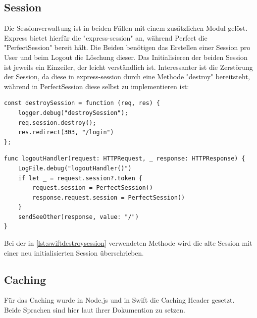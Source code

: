 \subsection{Session}
Die Sessionverwaltung ist in beiden Fällen mit einem zusätzlichen Modul gelöst. Express bietet hierfür die "express-session" an, während Perfect die "PerfectSession" bereit hält. Die Beiden benötigen das Erstellen einer Session pro User und beim Logout die Löschung dieser. Das Initialisieren der beiden Session ist jeweils ein Einzeiler, der leicht verständlich ist. Interessanter ist die Zerstörung der Session, da diese in express-session durch eine Methode "destroy" bereitsteht, während in PerfectSession diese selbst zu implementieren ist:

\begin{lstlisting}
const destroySession = function (req, res) {
    logger.debug("destroySession");
    req.session.destroy();
    res.redirect(303, "/login")
};
\end{lstlisting}


\begin{lstlisting}
func logoutHandler(request: HTTPRequest, _ response: HTTPResponse) {
    LogFile.debug("logoutHandler()")
    if let _ = request.session?.token {
        request.session = PerfectSession()
        response.request.session = PerfectSession()
    }
    sendSeeOther(response, value: "/")
}
\end{lstlisting}

Bei der in \ref{lst:swiftdestroysession} verwendeten Methode wird die alte Session mit einer neu initialisierten Session überschrieben.

\subsection{Caching}
Für das Caching wurde in Node.js und in Swift die Caching Header gesetzt. Beide Sprachen sind hier laut ihrer Dokumention zu setzen.

